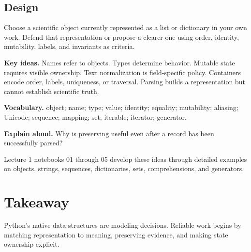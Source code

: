 \subsection*{Design}
Choose a scientific object currently represented as a list or dictionary in
your own work. Defend that representation or propose a clearer one using order,
identity, mutability, labels, and invariants as criteria.

\begin{chapterreview}
\textbf{Key ideas.} Names refer to objects. Types determine behavior. Mutable
state requires visible ownership. Text normalization is field-specific policy.
Containers encode order, labels, uniqueness, or traversal. Parsing builds a
representation but cannot establish scientific truth.

\textbf{Vocabulary.} object; name; type; value; identity; equality; mutability;
aliasing; Unicode; sequence; mapping; set; iterable; iterator; generator.

\textbf{Explain aloud.} Why is preserving  useful even after a
record has been successfully parsed?
\end{chapterreview}

\begin{notebooklink}
Lecture 1 notebooks 01 through 05 develop these ideas through detailed examples
on objects, strings, sequences, dictionaries, sets, comprehensions, and
generators.
\end{notebooklink}

\section{Takeaway}

Python's native data structures are modeling decisions. Reliable work begins by
matching representation to meaning, preserving evidence, and making state
ownership explicit.
